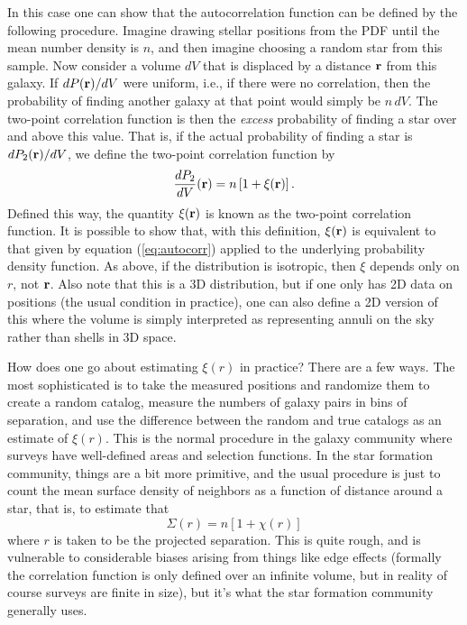 In this case one can show that the autocorrelation function can be defined by the following procedure. Imagine drawing stellar positions from the PDF until the mean number density is $n$, and then imagine choosing a random star from this sample. Now consider a volume $dV$ that is displaced by a distance $\mathbf{r}$ from this galaxy. If $dP(\mathbf{r})/dV$ were uniform, i.e., if there were no correlation, then the probability of finding another galaxy at that point would simply be $n\, dV$. The two-point correlation function is then the \textit{excess} probability of finding a star over and above this value. That is, if the actual probability of finding a star is $dP_2(\mathbf{r})/dV$, we define the two-point correlation function by
\begin{equation}
\frac{dP_2}{dV}(\mathbf{r}) = n \left[1 + \xi(\mathbf{r})\right].
\end{equation}
Defined this way, the quantity $\xi(\mathbf{r})$ is known as the two-point correlation function. It is possible to show that, with this definition, $\xi(\mathbf{r})$ is equivalent to that given by equation (\ref{eq:autocorr}) applied to the underlying probability density function. As above, if the distribution is isotropic, then $\xi$ depends only on $r$, not $\mathbf{r}$. Also note that this is a 3D distribution, but if one only has 2D data on positions (the usual condition in practice), one can also define a 2D version of this where the volume is simply interpreted as representing annuli on the sky rather than shells in 3D space.

How does one go about estimating $\xi(r)$ in practice? There are a few ways. The most sophisticated is to take the measured positions and randomize them to create a random catalog, measure the numbers of galaxy pairs in bins of separation, and use the difference between the random and true catalogs as an estimate of $\xi(r)$. This is the normal procedure in the galaxy community where surveys have well-defined areas and selection functions. In the star formation community, things are a bit more primitive, and the usual procedure is just to count the mean surface density of neighbors as a function of distance around a star, that is, to estimate that
\begin{equation}
\Sigma(r) = n \left[1 + \chi(r)\right]
\end{equation}
where $r$ is taken to be the projected separation. This is quite rough, and is vulnerable to considerable biases arising from things like edge effects (formally the correlation function is only defined over an infinite volume, but in reality of course surveys are finite in size), but it's what the star formation community generally uses.

